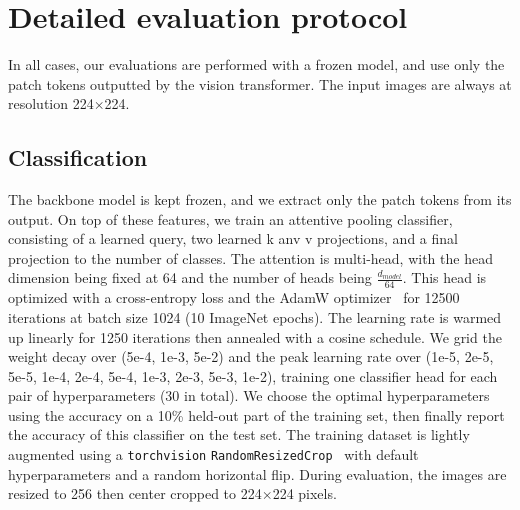 
\section{Detailed evaluation protocol}
\label{sec:eval_protocol}
In all cases, our evaluations are performed with a frozen model, and use only the patch tokens outputted by the vision transformer.
The input images are always at resolution 224$\times$224.
\subsection{Classification}
The backbone model is kept frozen, and we extract only the patch tokens from its output.
On top of these features, we train an attentive pooling classifier, consisting of a learned query, two learned k anv v projections, and a final projection to the number of classes.
The attention is multi-head, with the head dimension being fixed at 64 and the number of heads being $\frac{d_{model}}{64}$.
This head is optimized with a cross-entropy loss and the AdamW optimizer~\citep{adam,adamw} for 12500 iterations at batch size 1024 (10 ImageNet epochs).
The learning rate is warmed up linearly for 1250 iterations then annealed with a cosine schedule.
We grid the weight decay over (5e-4, 1e-3, 5e-2) and the peak learning rate over (1e-5, 2e-5, 5e-5, 1e-4, 2e-4, 5e-4, 1e-3, 2e-3, 5e-3, 1e-2), training one classifier head for each pair of hyperparameters (30 in total).
We choose the optimal hyperparameters using the accuracy on a 10\% held-out part of the training set, then finally report the accuracy of this classifier on the test set.
The training dataset is lightly augmented using a \texttt{torchvision} \texttt{RandomResizedCrop}~\citep{torchvision} with default hyperparameters and a random horizontal flip.
During evaluation, the images are resized to 256 then center cropped to 224$\times$224 pixels.


